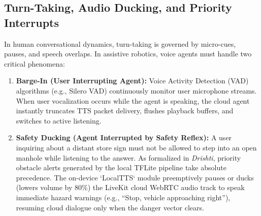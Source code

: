 \documentclass[10pt,twocolumn]{article}
\begin{document}
\subsection{Turn-Taking, Audio Ducking, and Priority Interrupts}
In human conversational dynamics, turn-taking is governed by micro-cues, pauses, and speech overlaps. In assistive robotics, voice agents must handle two critical phenomena:
\begin{enumerate}[leftmargin=*]
    \item \textbf{Barge-In (User Interrupting Agent):} Voice Activity Detection (VAD) algorithms (e.g., Silero VAD) continuously monitor user microphone streams. When user vocalization occurs while the agent is speaking, the cloud agent instantly truncates TTS packet delivery, flushes playback buffers, and switches to active listening.
    \item \textbf{Safety Ducking (Agent Interrupted by Safety Reflex):} A user inquiring about a distant store sign must not be allowed to step into an open manhole while listening to the answer. As formalized in \textit{Drishti}, priority obstacle alerts generated by the local TFLite pipeline take absolute precedence. The on-device `LocalTTS` module preemptively pauses or ducks (lowers volume by 80\%) the LiveKit cloud WebRTC audio track to speak immediate hazard warnings (e.g., ``Stop, vehicle approaching right''), resuming cloud dialogue only when the danger vector clears.
\end{enumerate}
\end{document}
